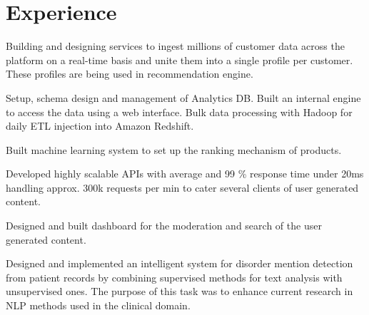 \documentclass[]{rajnikant-resume-openfont}
\begin{document}
\begin{minipage}[t]{0.66\textwidth} 


\section{Experience}

\begin{tightemize}
\item {}  Building and designing services to ingest millions of customer data across the platform on a
real-time basis and unite them into a single profile per customer. These profiles are being used in recommendation engine.
\item {} Setup, schema design and management of Analytics DB. Built an internal engine to
access the data using a web interface. Bulk data processing with Hadoop for daily ETL injection into Amazon Redshift.

\end{tightemize}
\sectionsep


\begin{tightemize}
\item Built machine learning system to set up the ranking mechanism of products. 
\item Developed highly scalable APIs with average and 99 \% response time under 20ms handling approx. 300k requests per min to cater several clients of user generated content.
\item Designed and built dashboard for the moderation  and search of the user generated content.
\end{tightemize}
\sectionsep

\begin{tightemize}
\item  {} Designed and implemented an intelligent system for disorder mention detection from
patient records by combining supervised methods for text analysis with unsupervised ones. The purpose of this
task was to enhance current research in NLP methods used in the clinical domain.
\end{tightemize}


\end{minipage}
\end{document}
